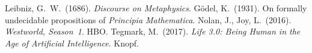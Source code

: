 \documentclass{article}
\begin{document}
\begin{thebibliography}{9}
 Leibniz, G.~W.\ (1686). \emph{Discourse on Metaphysics}.
 G\"odel, K.\ (1931). On formally undecidable propositions of \emph{Principia Mathematica}.
 Nolan, J., Joy, L.\ (2016). \emph{Westworld, Season~1}. HBO.
 Tegmark, M.\ (2017). \emph{Life 3.0: Being Human in the Age of Artificial Intelligence}. Knopf.
\end{thebibliography}
\end{document}
